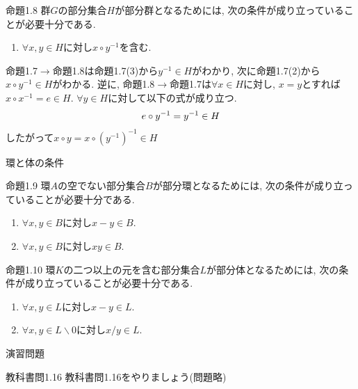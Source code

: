 \documentclass[dvipdfmx,11pt,notheorems]{beamer}
\begin{document}
\begin{frame}
  \begin{block}{命題1.8}
    群$G$の部分集合$H$が部分群となるためには, 次の条件が成り立っていることが必要十分である.
    \begin{enumerate}
      \item $\forall x, y \in H$に対し$x \circ y^{-1}$を含む.
    \end{enumerate}
    命題1.7$\rightarrow$命題1.8は命題1.7(3)から$y^{-1} \in H$がわかり, 次に命題1.7(2)から$x \circ y^{-1} \in H$がわかる.
    逆に, 命題1.8$\rightarrow$命題1.7は$\forall x \in H$に対し, $x = y$とすれば$x \circ x^{-1} = e \in H$. $\forall y \in H$に対して以下の式が成り立つ.
    \begin{align}
      e \circ y^{-1} = y ^{-1} \in H \notag
    \end{align}
    したがって$x \circ y = x \circ (y^{-1})^{-1} \in H$
  \end{block}
\end{frame}
\begin{frame}{環と体の条件}
  \begin{block}{命題1.9}
    環$A$の空でない部分集合$B$が部分環となるためには, 次の条件が成り立っていることが必要十分である.
    \begin{enumerate}
      \item $\forall x, y \in B$に対し$x - y \in B$.
      \item $\forall x, y \in B$に対し$xy \in B$.
    \end{enumerate}
  \end{block}

  \begin{block}{命題1.10}
    環$K$の二つ以上の元を含む部分集合$L$が部分体となるためには, 次の条件が成り立っていることが必要十分である.
    \begin{enumerate}
      \item $\forall x, y \in L$に対し$x - y \in L$.
      \item $\forall x, y \in L \backslash {0}$に対し$x / y \in L$.
    \end{enumerate}
  \end{block}
\end{frame}

\begin{frame}{演習問題}
  \begin{exampleblock}{教科書問1.16}
    教科書問1.16をやりましょう(問題略)
  \end{exampleblock}
\end{frame}
\end{document}
